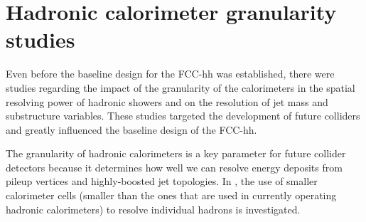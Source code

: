 \section{Hadronic calorimeter granularity studies}

Even before the baseline design for the FCC-hh was established, there were studies regarding the impact of the granularity of the calorimeters in the spatial resolving power of hadronic showers and on the resolution of jet mass and substructure variables. These studies targeted the development of future colliders and greatly influenced the baseline design of the FCC-hh.

The granularity of hadronic calorimeters is a key parameter for future collider detectors because it determines how well we can resolve energy deposits from pileup vertices and highly-boosted jet topologies. In \cite{FCC_HCALgran_doubleK}, the use of smaller calorimeter cells (smaller than the ones that are used in currently operating hadronic calorimeters) to resolve individual hadrons is investigated. 
